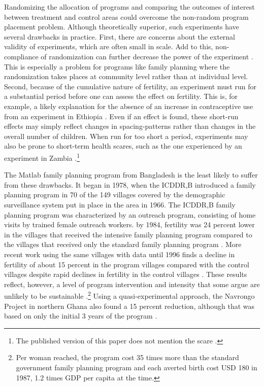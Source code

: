 \documentclass[]{article}
\begin{document}
Randomizing the allocation of programs and comparing the outcomes of interest between treatment and control areas could overcome the non-random program placement problem. Although theoretically superior, such experiments have several drawbacks in practice. First, there are concerns about the external validity of experiments, which are often small in scale. Add to this, non-compliance of randomization can further decrease the power of the experiment \citep{Desai2011}. This is especially a problem for programs like family planning where the randomization takes places at community level rather than at individual level. Second, because of the cumulative nature of fertility, an experiment must run for a substantial period before one can assess the effect on fertility. This is, for example, a likely explanation for the absence of an increase in contraceptive use from an experiment in Ethiopia \citep{Desai2011}. Even if an effect is found, these short-run effects may simply reflect changes in spacing-patterns rather than changes in the overall number of children. When run for too short a period, experiments may also be prone to short-term health scares, such as the one experienced by an experiment in Zambia \citep{Ashraf2009}.\footnote{The published version of this paper does not mention the scare \citep{Ashraf2014}.}

The Matlab family planning program from Bangladesh is the least likely to suffer from these drawbacks. It began in 1978, when the ICDDR,B introduced a family planning program in 70 of the 149 villages covered by the demographic surveillance system put in place in the area in 1966. The ICDDR,B family planning program was characterized by an outreach program, consisting of home visits by trained female outreach workers. by 1984, fertility was 24 percent lower in the villages that received the intensive family planning program compared to the villages that received only the standard family planning program \citep{Phillips1988}. More recent work using the same villages with data until 1996 finds a decline in fertility of about 15 percent in the program villages compared with the control villages despite rapid declines in fertility in the control villages \citep{Sinha2005,Joshi2007}. These results reflect, however, a level of program intervention and intensity that some argue are unlikely to be sustainable \citep{pritchett94a}.\footnote{Per woman reached, the program cost 35 times more than the standard government family planning program and each averted birth cost USD 180 in 1987, 1.2 times GDP per capita at the time.} Using a quasi-experimental approach, the Navrongo Project in northern Ghana also found a 15 percent reduction, although that was based on only the initial 3 years of the program \citep{Debpuur2002}.
\end{document}
